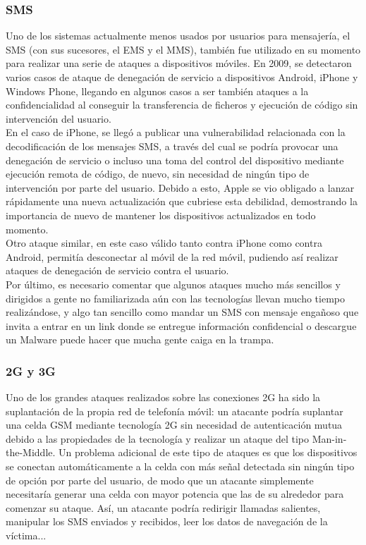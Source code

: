\documentclass[11pt]{article}
\begin{document}
\subsubsection{SMS}

{Uno de los sistemas actualmente menos usados por usuarios para mensajería, el SMS (con sus sucesores, el EMS y el MMS), también fue utilizado en su momento para realizar una serie de ataques a dispositivos móviles. En 2009, se detectaron varios casos de ataque de denegación de servicio a dispositivos Android, iPhone y Windows Phone, llegando en algunos casos a ser también ataques a la confidencialidad al conseguir la transferencia de ficheros y ejecución de código sin intervención del usuario.} \\

{En el caso de iPhone, se llegó a publicar una vulnerabilidad relacionada con la decodificación de los mensajes SMS, a través del cual se podría provocar una denegación de servicio o incluso una toma del control del dispositivo mediante ejecución remota de código, de nuevo, sin necesidad de ningún tipo de intervención por parte del usuario. Debido a esto, Apple se vio obligado a lanzar rápidamente una nueva actualización que cubriese esta debilidad, demostrando la importancia de nuevo de mantener los dispositivos actualizados en todo momento.} \\

{Otro ataque similar, en este caso válido tanto contra iPhone como contra Android, permitía desconectar al móvil de la red móvil, pudiendo así realizar ataques de denegación de servicio contra el usuario.} \\

{Por último, es necesario comentar que algunos ataques mucho más sencillos y dirigidos a gente no familiarizada aún con las tecnologías llevan mucho tiempo realizándose, y algo tan sencillo como mandar un SMS con mensaje engañoso que invita a entrar en un link donde se entregue información confidencial o descargue un Malware puede hacer que mucha gente caiga en la trampa.}

\subsubsection{2G y 3G}

{Uno de los grandes ataques realizados sobre las conexiones 2G ha sido la suplantación de la propia red de telefonía móvil: un atacante podría suplantar una celda GSM mediante tecnología 2G sin necesidad de autenticación mutua debido a las propiedades de la tecnología y realizar un ataque del tipo Man-in-the-Middle. Un problema adicional de este tipo de ataques es que los dispositivos se conectan automáticamente a la celda con más señal detectada sin ningún tipo de opción por parte del usuario, de modo que un atacante simplemente necesitaría generar una celda con mayor potencia que las de su alrededor para comenzar su ataque. Así, un atacante podría redirigir llamadas salientes, manipular los SMS enviados y recibidos, leer los datos de navegación de la víctima...} \\
\end{document}
